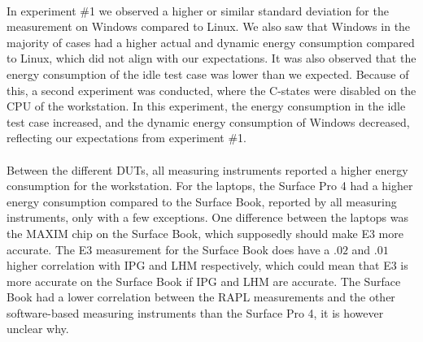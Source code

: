 
\paragraph*{}
In experiment \#1 we observed a higher or similar standard deviation for the measurement on Windows compared to Linux. We also saw that Windows in the majority of cases had a higher actual and dynamic energy consumption compared to Linux, which did not align with our expectations. It was also observed that the energy consumption of the idle test case was lower than we expected. Because of this, a second experiment was conducted, where the C-states were disabled on the CPU of the workstation. In this experiment, the energy consumption in the idle test case increased, and the dynamic energy consumption of Windows decreased, reflecting our expectations from experiment \#1.

\paragraph*{}
Between the different DUTs, all measuring instruments reported a higher energy consumption for the workstation. For the laptops, the Surface Pro 4 had a higher energy consumption compared to the Surface Book, reported by all measuring instruments, only with a few exceptions. One difference between the laptops was the MAXIM chip on the Surface Book, which supposedly should make E3 more accurate. The E3 measurement for the Surface Book does have a $.02$ and $.01$ higher correlation with IPG and LHM respectively, which could mean that E3 is more accurate on the Surface Book if IPG and LHM are accurate. The Surface Book had a lower correlation between the RAPL measurements and the other software-based measuring instruments than the Surface Pro 4, it is however unclear why.

